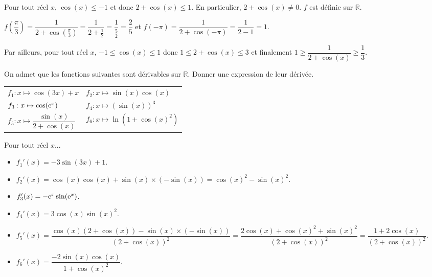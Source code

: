 \documentclass[11pt,fleqn, openany]{book} %
\begin{document}
\begin{solution}  Pour tout réel $x$, $\cos(x)\leqslant -1$ et donc $2+\cos(x) \leqslant 1$. En particulier, $2+\cos(x) \neq 0$. $f$ est définie sur $\mathbb{R}$.

$f\left(\dfrac{\pi}{3}\right)=\dfrac{1}{2+\cos\left(\frac{\pi}{3}\right)}=\dfrac{1}{2+\frac{1}{2}}=\dfrac{1}{\frac{5}{2}}=\dfrac{2}{5}$ et $f(-\pi)=\dfrac{1}{2+\cos(-\pi)}=\dfrac{1}{2-1}=1$.

Par ailleurs, pour tout réel $x$, $-1 \leqslant \cos(x) \leqslant 1$ donc $1 \leqslant 2+\cos(x) \leqslant 3$ et finalement $1 \geqslant \dfrac{1}{2+\cos(x)} \geqslant \dfrac{1}{3}$.
\end{solution}





\begin{exercise}[topic=trig02]On admet que les fonctions suivantes sont dérivables sur $\mathbb{R}$. Donner une expression de leur dérivée.

\renewcommand{\arraystretch}{1}
\begin{tabularx}{\linewidth}{XX}
 $f_1 : x \mapsto \cos(3x)+x$
& $f_2: x \mapsto \sin(x)\cos(x)$ \\
 $f_3 : x \mapsto \cos(\mathrm{e}^x)$
&$f_4 :x \mapsto (\sin(x))^3$ \\
$f_5 : x\mapsto \dfrac{\sin(x)}{2+\cos(x)}$ & $f_6:x\mapsto \ln(1+\cos(x)^2)$
\end{tabularx}
\end{exercise}

\begin{solution}Pour tout réel $x$...

\begin{itemize}
\item $f_1'(x)=-3\sin(3x)+1$.
\vskip5pt
\item $f_2'(x)=\cos(x)\cos(x)+\sin(x) \times (-\sin(x))=\cos(x)^2-\sin(x)^2$.
\vskip5pt
\item $f_3'(x)=-\mathrm{e}^x\sin(\mathrm{e}^x)$.
\vskip5pt
\item $f_4'(x)=3\cos(x)\sin(x)^2$.
\vskip5pt
\item $f_5'(x)=\dfrac{\cos(x)(2+ \cos(x))-\sin(x)\times(-\sin(x))}{(2+\cos(x))^2}=\dfrac{2\cos(x)+\cos(x)^2+\sin(x)^2}{(2+\cos(x))^2}=\dfrac{1+2\cos(x)}{(2+\cos(x))^2}$.
\vskip5pt
\item $f_6'(x)=\dfrac{-2\sin(x)\cos(x)}{1+\cos(x)^2}$.
\end{itemize}
\end{solution}
\end{document}
